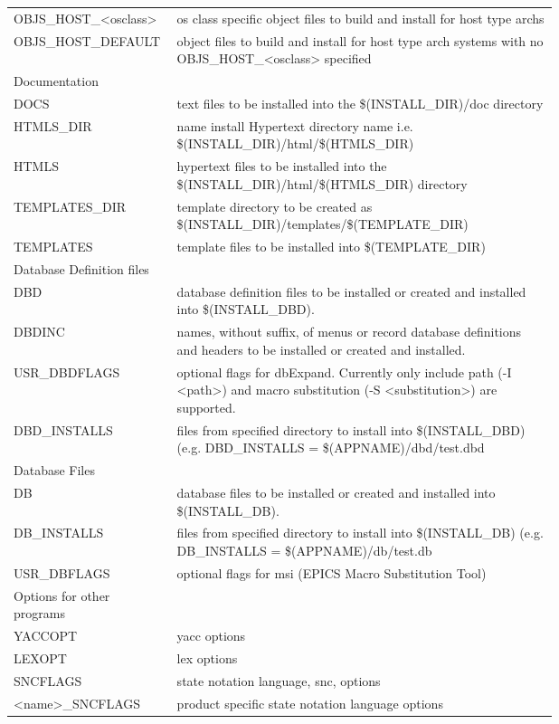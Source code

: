 \begin{center}
\begin{longtable}{lp{0.7\linewidth}}
OBJS\_HOST\_\textless{}osclass\textgreater{} & os class specific object files to build and install for host type archs\\
OBJS\_HOST\_DEFAULT & object files to build and install for host type arch systems with no OBJS\_HOST\_\textless{}osclass\textgreater{} specified\\
Documentation &    \\
DOCS & text files to be installed into the \$(INSTALL\_DIR)/doc directory\\
HTMLS\_DIR & name install Hypertext directory name i.e. \$(INSTALL\_DIR)/html/\$(HTMLS\_DIR)\\
HTMLS & hypertext files to be installed into the \$(INSTALL\_DIR)/html/\$(HTMLS\_DIR) directory\\
TEMPLATES\_DIR & template directory to be created as \$(INSTALL\_DIR)/templates/\$(TEMPLATE\_DIR)\\
TEMPLATES & template files to be installed into \$(TEMPLATE\_DIR)\\
Database Definition files & \\
DBD & database definition files to be installed or created and installed into \$(INSTALL\_DBD).\\
DBDINC & names, without suffix, of menus or record database definitions and headers to be installed or created and installed. \\
USR\_DBDFLAGS & optional flags for dbExpand. Currently only include path (-I \textless{}path\textgreater{}) and macro substitution (-S \textless{}substitution\textgreater{}) are supported. \\
DBD\_INSTALLS & files from specified directory to install into \$(INSTALL\_DBD) (e.g. DBD\_INSTALLS = \$(APPNAME)/dbd/test.dbd\\
Database Files & \\
DB & database files to be installed or created and installed into \$(INSTALL\_DB).\\
DB\_INSTALLS & files from specified directory to install into \$(INSTALL\_DB) (e.g. DB\_INSTALLS = \$(APPNAME)/db/test.db\\
USR\_DBFLAGS & optional flags for msi (EPICS Macro Substitution Tool)\\
Options for other programs &    \\
YACCOPT & yacc options\\
LEXOPT & lex options\\
SNCFLAGS & state notation language, snc, options\\
\textless{}name\textgreater{}\_SNCFLAGS & product specific state notation language options\\

\end{longtable}
\end{center}

